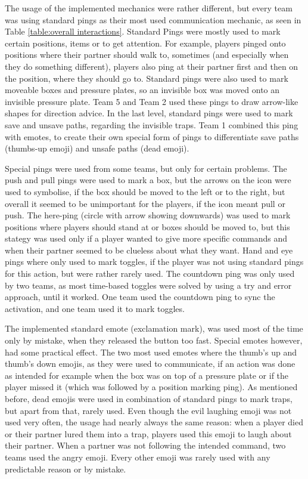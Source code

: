 The usage of the implemented mechanics were rather different, but every team was using standard pings as their most used communication mechanic, as seen in Table \ref{table:overall interactions}. 
Standard Pings were mostly used to mark certain positions, items or to get attention. For example, players pinged onto positions where their partner should walk to, sometimes (and especially when they do something different), players also ping at their partner first and then on the position, where they should go to.
Standard pings were also used to mark moveable boxes and pressure plates, so an invisible box was moved onto an invisible pressure plate. Team 5 and Team 2 used these pings to draw arrow-like shapes for direction advice. 
In the last level, standard pings were used to mark save and unsave paths, regarding the invisible traps. Team 1 combined this ping with emotes, to create their own special form of pings to differentiate save paths (thumbs-up emoji) and unsafe paths (dead emoji).

Special pings were used from some teams, but only for certain problems. The push and pull pings were used to mark a box, but the arrows on the icon were used to symbolise, if the box should be moved to the left or to the right, but overall it seemed to be unimportant for the players, if the icon meant pull or push.
The here-ping (circle with arrow showing downwards) was used to mark positions where players should stand at or boxes should be moved to, but this stategy was used only if a player wanted to give more specific commands and when their partner seemed to be clueless about what they want.
Hand and eye pings where only used to mark toggles, if the player was not using standard pings for this action, but were rather rarely used.
The countdown ping was only used by two teams, as most time-based toggles were solved by using a try and error approach, until it worked. One team used the countdown ping to sync the activation, and one team used it to mark toggles.

The implemented standard emote (exclamation mark), was used most of the time only by mistake, when they released the button too fast.
Special emotes however, had some practical effect. The two most used emotes where the thumb's up and thumb's down emojis, as they were used to communicate, if an action was done as intended for example when the box was on top of a pressure plate or if the player missed it (which was followed by a position marking ping).
As mentioned before, dead emojis were used in combination of standard pings to mark traps, but apart from that, rarely used. Even though the evil laughing emoji was not used very often, the usage had nearly always the same reason: when a player died or their partner lured them into a trap, players used this emoji to laugh about their partner. When a partner was not following the intended command, two teams used the angry emoji. Every other emoji was rarely used with any predictable reason or by mistake.

